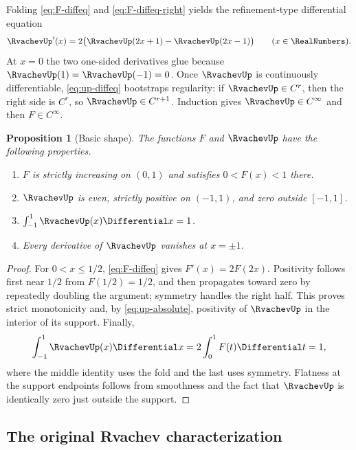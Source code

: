 \documentclass[11pt,oneside]{article}
\newtheorem{proposition}[theorem]{Proposition}
\theoremstyle{definition}
\theoremstyle{remark}
\begin{document}
Folding \eqref{eq:F-diffeq} and \eqref{eq:F-diffeq-right} yields the refinement-type
differential equation
\begin{equation}
 \RvachevUp'(x)=2\bigl(\RvachevUp(2x+1)-\RvachevUp(2x-1)\bigr)\qquad(x\in\RealNumbers).  \label{eq:up-diffeq}
\end{equation}
At $x=0$ the two one-sided derivatives glue because $\RvachevUp(1)=\RvachevUp(-1)=0$.  Once $\RvachevUp$ is
continuously differentiable, \eqref{eq:up-diffeq} bootstraps regularity: if $\RvachevUp\in C^r$,
then the right side is $C^r$, so $\RvachevUp\in C^{r+1}$.  Induction gives $\RvachevUp\in C^\infty$ and
then $F\in C^\infty$.

\begin{proposition}[Basic shape]
The functions $F$ and $\RvachevUp$ have the following properties.
\begin{enumerate}
\item $F$ is strictly increasing on $(0,1)$ and satisfies $0<F(x)<1$ there.
\item $\RvachevUp$ is even, strictly positive on $(-1,1)$, and zero outside $[-1,1]$.
\item $\int_{-1}^{1}\RvachevUp(x)\Differential x=1$.
\item Every derivative of $\RvachevUp$ vanishes at $x=\pm1$.
\end{enumerate}
\end{proposition}

\begin{proof}
For $0<x\le1/2$, \eqref{eq:F-diffeq} gives $F'(x)=2F(2x)$.  Positivity follows first near
$1/2$ from $F(1/2)=1/2$, and then propagates toward zero by repeatedly doubling the
argument; symmetry handles the right half.  This proves strict monotonicity and, by
\eqref{eq:up-absolute}, positivity of $\RvachevUp$ in the interior of its support.  Finally,
\begin{equation*}
 \int_{-1}^{1}\RvachevUp(x)\Differential x
 =2\int_0^1F(t)\Differential t=1,
\end{equation*}
where the middle identity uses the fold and the last uses symmetry.  Flatness at the support
endpoints follows from smoothness and the fact that $\RvachevUp$ is identically zero just outside
the support.
\end{proof}

\subsection{The original Rvachev characterization}
\end{document}
